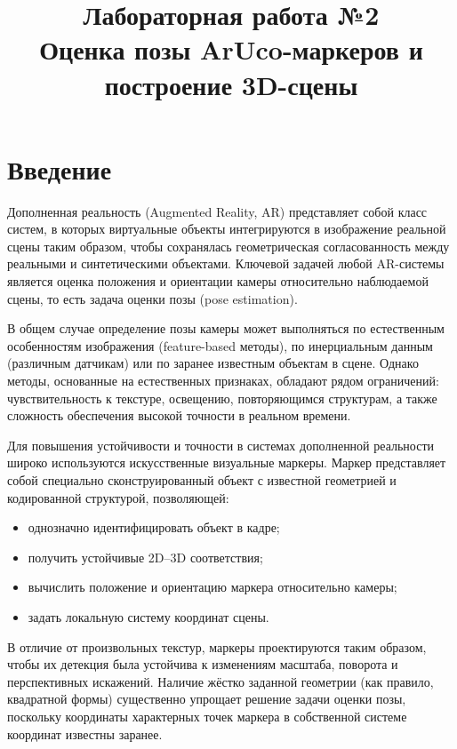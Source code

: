 \documentclass[a4paper,12pt]{article}
\title{Лабораторная работа №2 \\
Оценка позы ArUco-маркеров и построение 3D-сцены}
\author{}
\date{}
\begin{document}
\maketitle


\section*{Введение}

Дополненная реальность (Augmented Reality, AR) представляет собой класс систем, в которых виртуальные объекты интегрируются в изображение реальной сцены таким образом, чтобы сохранялась геометрическая согласованность между реальными и синтетическими объектами. Ключевой задачей любой AR-системы является оценка положения и ориентации камеры относительно наблюдаемой сцены, то есть задача оценки позы (pose estimation).

В общем случае определение позы камеры может выполняться по естественным особенностям изображения (feature-based методы), по инерциальным данным (различным датчикам) или по заранее известным объектам в сцене. Однако методы, основанные на естественных признаках, обладают рядом ограничений: чувствительность к текстуре, освещению, повторяющимся структурам, а также сложность обеспечения высокой точности в реальном времени.

Для повышения устойчивости и точности в системах дополненной реальности широко используются искусственные визуальные маркеры. Маркер представляет собой специально сконструированный объект с известной геометрией и кодированной структурой, позволяющей:

\begin{itemize}
    \item однозначно идентифицировать объект в кадре;
    \item получить устойчивые 2D--3D соответствия;
    \item вычислить положение и ориентацию маркера относительно камеры;
    \item задать локальную систему координат сцены.
\end{itemize}

В отличие от произвольных текстур, маркеры проектируются таким образом, чтобы их детекция была устойчива к изменениям масштаба, поворота и перспективных искажений. Наличие жёстко заданной геометрии (как правило, квадратной формы) существенно упрощает решение задачи оценки позы, поскольку координаты характерных точек маркера в собственной системе координат известны заранее.
\end{document}

